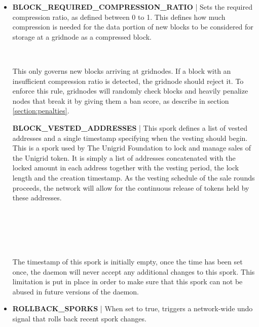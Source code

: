 \documentclass[10pt,a4paper,final]{article}
\newcommand{\colorbitbox}[3]{%
  \rlap{\bitbox{#2}{\color{#1}\rule{\width}{\height}}}%
  \bitbox{#2}{#3}
}
\begin{document}
\begin{itemize}
\item \textbf{BLOCK\_REQUIRED\_COMPRESSION\_RATIO} | Sets the required compression ratio, as defined between 0 to 1. This defines how much compression is needed for the data portion of new blocks to be considered for storage at a \gls{gridnode} as a compressed block.

\medskip
\begin{bytefield}[bitwidth=0.5em]{64}
	 \\
	\colorbitbox{lightgray}{32}{reserved}
\end{bytefield}

This only governs new blocks arriving at \glspl{gridnode}. If a block with an insufficient compression ratio is detected, the \gls{gridnode} should reject it. To enforce this rule, \glspl{gridnode} will randomly check blocks and heavily penalize nodes that break it by giving them a ban score, as describe in section \ref{section:penalties}.

\textbf{BLOCK\_VESTED\_ADDRESSES} | This spork defines a list of vested addresses and a single timestamp specifying when the vesting should begin. This is a spork used by The Unigrid Foundation to lock and manage sales of the Unigrid token. It is simply a list of addresses concatenated with the locked amount in each address together with the vesting period, the lock length and the creation timestamp. As the vesting schedule of the sale rounds proceeds, the network will allow for the continuous release of tokens held by these addresses.

\medskip
\begin{bytefield}[bitwidth=0.5em]{64}
	 \\
	\colorbitbox{lightgray}{32}{reserved} \\
	 \\
	\skippedwords \\
\end{bytefield}

The timestamp of this spork is initially empty, once the time has been set once, the daemon will never accept any additional changes to this spork. This limitation is put in place in order to make sure that this spork can not be abused in future versions of the daemon.

\item \textbf{ROLLBACK\_SPORKS} | When set to true, triggers a network-wide undo signal that rolls back recent spork changes.


\end{itemize}
\end{document}
